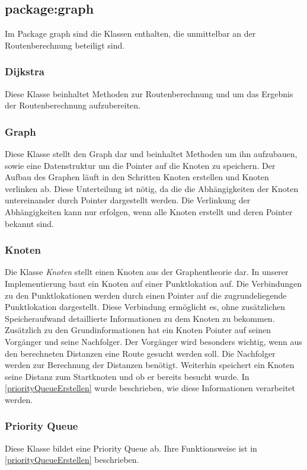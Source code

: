 \documentclass[12pt, a4paper, ngerman]{article}
\begin{document}
\subsection{package:graph}
Im Package graph sind die Klassen enthalten, die unmittelbar an der Routenberechnung beteiligt sind.

\subsubsection{Dijkstra}
Diese Klasse beinhaltet Methoden zur Routenberechnung und um das Ergebnis der Routenberechnung aufzubereiten. 

\subsubsection{Graph}
Diese Klasse stellt den Graph dar und beinhaltet Methoden um ihn aufzubauen, sowie eine Datenstruktur um die Pointer auf die Knoten zu speichern. Der Aufbau des Graphen läuft in den Schritten \glqq Knoten erstellen \grqq und \glqq Knoten verlinken \grqq ab. Diese Unterteilung ist nötig, da die die Abhängigkeiten der Knoten untereinander durch Pointer dargestellt werden. Die Verlinkung der Abhängigkeiten kann nur erfolgen, wenn alle Knoten erstellt und deren Pointer bekannt sind.



\subsubsection{Knoten}
Die Klasse \textit{Knoten} stellt einen Knoten aus der Graphentheorie dar. In unserer Implementierung baut ein Knoten auf einer Punktlokation auf. Die Verbindungen zu den Punktlokationen werden durch einen Pointer auf die zugrundeliegende Punktlokation dargestellt. Diese Verbindung ermöglicht es, ohne zusätzlichen Speicheraufwand detaillierte Informationen zu dem Knoten zu bekommen. Zusätzlich zu den Grundinformationen hat ein Knoten Pointer auf seinen Vorgänger und seine Nachfolger. Der Vorgänger wird besonders wichtig, wenn aus den berechneten Distanzen eine Route gesucht werden soll. Die Nachfolger werden zur Berechnung der Distanzen benötigt. Weiterhin speichert ein Knoten seine Distanz zum Startknoten und ob er bereits besucht wurde. In \ref{priorityQueueErstellen} wurde beschrieben, wie diese Informationen verarbeitet werden.


\subsubsection{Priority Queue}
Diese Klasse bildet eine Priority Queue ab. Ihre Funktionsweise ist in \ref{priorityQueueErstellen} beschrieben. 
\end{document}
